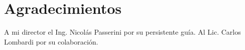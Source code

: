 
\section{Agradecimientos}

A mi director el Ing. Nicolás Passerini por su persistente guía. Al Lic. 
Carlos Lombardi por su colaboración. 

